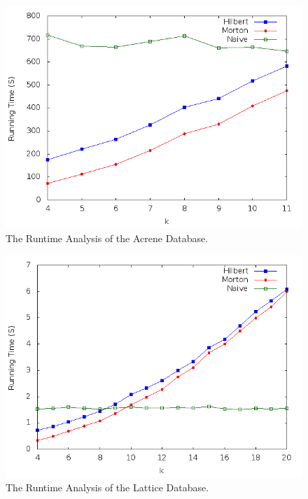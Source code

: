 \documentclass[10pt]{article}
\begin{document}
\begin{figure}
\begin{center}
\includegraphics[scale=0.5]{ArcGra.png}
\caption{The Runtime Analysis of the Acrene Database.}
\label{run-arcene}
\end{center}
\end{figure}

\begin{figure}
\begin{center}
\includegraphics[scale=0.5]{LatGra.png}
\caption{The Runtime Analysis of the Lattice Database.}
\label{run-lattice}
\end{center}
\end{figure}
\end{document}
